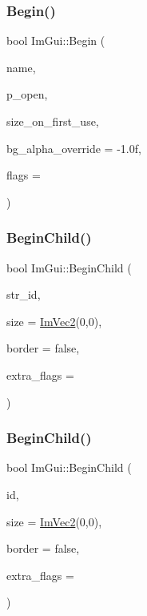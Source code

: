 \subsubsection{\texorpdfstring{Begin()}{Begin()}\hspace{0.1cm}{\footnotesize\ttfamily [2/2]}}
{\footnotesize\ttfamily bool Im\+Gui\+::\+Begin (\begin{DoxyParamCaption}\item[{const char $\ast$}]{name,  }\item[{bool $\ast$}]{p\+\_\+open,  }\item[{const \hyperlink{struct_im_vec2}{Im\+Vec2} \&}]{size\+\_\+on\+\_\+first\+\_\+use,  }\item[{float}]{bg\+\_\+alpha\+\_\+override = {\ttfamily -\/1.0f},  }\item[{Im\+Gui\+Window\+Flags}]{flags = {} }\end{DoxyParamCaption})}

\hypertarget{namespace_im_gui_a93b10a516e6da427b743906ad97d7f16}{}\label{namespace_im_gui_a93b10a516e6da427b743906ad97d7f16} 
\subsubsection{\texorpdfstring{Begin\+Child()}{BeginChild()}\hspace{0.1cm}{\footnotesize\ttfamily [1/2]}}
{\footnotesize\ttfamily bool Im\+Gui\+::\+Begin\+Child (\begin{DoxyParamCaption}\item[{const char $\ast$}]{str\+\_\+id,  }\item[{const \hyperlink{struct_im_vec2}{Im\+Vec2} \&}]{size = {\ttfamily \hyperlink{struct_im_vec2}{Im\+Vec2}(0,0)},  }\item[{bool}]{border = {\ttfamily false},  }\item[{Im\+Gui\+Window\+Flags}]{extra\+\_\+flags = {} }\end{DoxyParamCaption})}

\hypertarget{namespace_im_gui_a3320a3f36d9d8b227f93a015792379d3}{}\label{namespace_im_gui_a3320a3f36d9d8b227f93a015792379d3} 
\subsubsection{\texorpdfstring{Begin\+Child()}{BeginChild()}\hspace{0.1cm}{\footnotesize\ttfamily [2/2]}}
{\footnotesize\ttfamily bool Im\+Gui\+::\+Begin\+Child (\begin{DoxyParamCaption}\item[{Im\+Gui\+ID}]{id,  }\item[{const \hyperlink{struct_im_vec2}{Im\+Vec2} \&}]{size = {\ttfamily \hyperlink{struct_im_vec2}{Im\+Vec2}(0,0)},  }\item[{bool}]{border = {\ttfamily false},  }\item[{Im\+Gui\+Window\+Flags}]{extra\+\_\+flags = {} }\end{DoxyParamCaption})}

